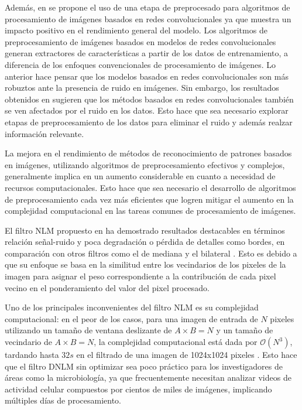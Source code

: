 Adem\'as, en \cite{CNN_DNLM} se propone el uso de una etapa de preprocesado para algoritmos de procesamiento de im\'agenes basados en redes convolucionales ya que muestra un impacto positivo en el rendimiento general del modelo. Los algoritmos de preprocesamiento de im\'agenes basados en modelos de redes convolucionales generan extractores de caracter\'isticas a partir de los datos de entrenamiento, a diferencia de los enfoques convencionales de procesamiento de im\'agenes. Lo anterior hace pensar que los modelos basados en redes convolucionales son m\'as robuztos ante la presencia de ruido en im\'agenes. Sin embargo, los resultados obtenidos en \cite{CNN_DNLM} sugieren que los m\'etodos basados en redes convolucionales tambi\'en se ven afectados por el ruido en los datos. Esto hace que sea necesario explorar etapas de preprocesamiento de los datos para eliminar el ruido y adem\'as realzar informaci\'on relevante.

La mejora en el rendimiento de m\'etodos de reconocimiento de patrones basados en im\'agenes, utilizando algoritmos de preprocesamiento efectivos y complejos, generalmente implica en un aumento considerable en cuanto a necesidad de recursos computacionales. Esto hace que sea necesario el desarrollo de algoritmos de preprocesamiento cada vez m\'as eficientes que logren mitigar el aumento en la complejidad computacional en las tareas comunes de procesamiento de im\'agenes. 


El filtro NLM propuesto en \cite{buades2005non} ha demostrado resultados destacables en t\'erminos relaci\'on se\~nal-ruido y poca degradaci\'on o p\'erdida de detalles como bordes, en comparaci\'on con otros filtros como el de mediana y el bilateral \cite{CONCAPAN2016}. Esto es debido a que su enfoque se basa en la similitud entre los vecindarios de los pixeles de la imagen para asignar el peso correspondiente a la contribuci\'on de cada pixel vecino en el ponderamiento del valor del pixel procesado. 

Uno de los principales inconvenientes del filtro NLM es su complejidad computacional: en el peor de los casos, para una imagen de entrada de $N$ pixeles utilizando un tamaño de ventana deslizante de $A\times B = N$ y un tamaño de vecindario de $A\times B = N$, la complejidad computacional est\'a dada por $\mathcal{O}(N^{3})$, tardando hasta $32s$ en el filtrado de una imagen de 1024x1024 pixeles \cite{Zhu2016}. Esto hace que el filtro DNLM sin optimizar sea poco pr\'actico para los investigadores de \'areas como la microbiolog\'ia, ya que frecuentemente necesitan analizar videos de actividad celular compuestos por cientos de miles de im\'agenes, implicando m\'ultiples d\'ias de procesamiento. 

